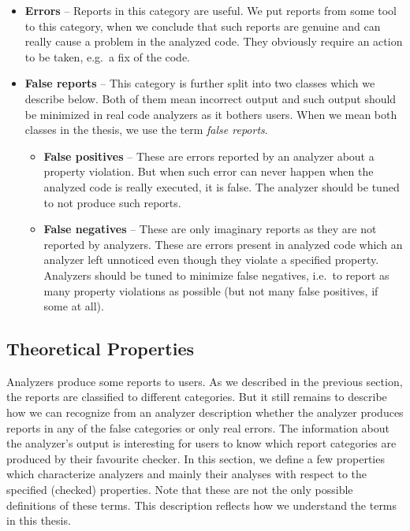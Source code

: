 \begin{itemize}
\item \textbf{Errors} -- Reports in this category are useful. We put reports
from some tool to this category, when we conclude that such reports are
genuine and can really cause a problem in the analyzed code. They obviously
require an action to be taken, e.g.\ a fix of the code.

\item \textbf{False reports} -- This category is further split into two
classes which we describe below. Both of them mean incorrect output and such
output should be minimized in real code analyzers as it bothers users. When
we mean both classes in the thesis, we use the term \emph{false reports}.

\begin{itemize}
\item \textbf{False positives} -- These are errors reported by an analyzer
about a property violation. But when such error can never happen when the
analyzed code is really executed, it is false. The analyzer should be tuned to
not produce such reports.

\item \textbf{False negatives} -- These are only imaginary reports as they are
not reported by analyzers. These are errors present in analyzed code which an
analyzer left unnoticed even though they violate a specified property.
Analyzers should be tuned to minimize false negatives, i.e.\ to report as many
property violations as possible (but not many false positives, if some at
all).

\end{itemize}

\end{itemize}

\subsection{Theoretical Properties}\label{sec:theor_props}
Analyzers produce some reports to users. As we described in the previous
section, the reports are classified to different categories. But it still
remains to describe how we can recognize from an analyzer description whether
the analyzer produces reports in any of the false categories or only real
errors. The information about the analyzer's output is interesting for users
to know which report categories are produced by their favourite checker.  In
this section, we define a few properties which characterize analyzers and
mainly their analyses with respect to the specified (checked) properties. Note
that these are not the only possible definitions of these terms. This
description reflects how we understand the terms in this thesis.

